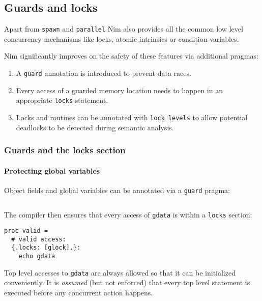 \hypertarget{guards-and-locks}{%
\subsection{Guards and locks}\label{guards-and-locks}}

Apart from \texttt{spawn} and \texttt{parallel} Nim also provides all
the common low level concurrency mechanisms like locks, atomic
intrinsics or condition variables.

Nim significantly improves on the safety of these features via
additional pragmas:

\begin{enumerate}
\def\labelenumi{\arabic{enumi})}
\tightlist
\item
  A \texttt{guard} annotation is introduced to prevent data races.
\item
  Every access of a guarded memory location needs to happen in an
  appropriate \texttt{locks} statement.
\item
  Locks and routines can be annotated with \texttt{lock\ levels} to
  allow potential deadlocks to be detected during semantic analysis.
\end{enumerate}

\hypertarget{guards-and-the-locks-section}{%
\subsubsection{Guards and the locks
section}\label{guards-and-the-locks-section}}

\hypertarget{protecting-global-variables}{%
\paragraph{Protecting global
variables}\label{protecting-global-variables}}

Object fields and global variables can be annotated via a \texttt{guard}
pragma:

\begin{verbatim}
\end{verbatim}

The compiler then ensures that every access of \texttt{gdata} is within
a \texttt{locks} section:

\begin{verbatim}
proc valid =
  # valid access:
  {.locks: [glock].}:
    echo gdata
\end{verbatim}

Top level accesses to \texttt{gdata} are always allowed so that it can
be initialized conveniently. It is \emph{assumed} (but not enforced)
that every top level statement is executed before any concurrent action
happens.

